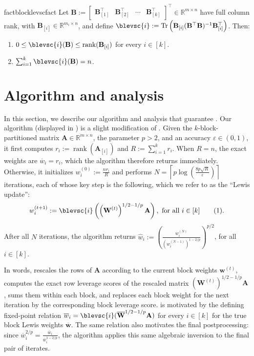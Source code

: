 \documentclass[11pt]{article}
\newcommand\numberthis{\addtocounter{equation}{1}\tag{\theequation}}
\theoremstyle{plain}
\numberwithin{equation}{section}
\newcommand{\R}{\mathbb{R}}
\newcommand{\Tr}{\operatorname{Tr}}
\newcommand{\rank}{\operatorname{rank}}
\newcommand{\eps}{\varepsilon}
\newcommand{\bA}{\mathbf{A}}
\newcommand{\bB}{\mathbf{B}}
\newcommand{\bW}{\mathbf{W}}
\newcommand{\bw}{\mathbf{w}}
\newcommand{\bwbar}{\overline{\mathbf{w}}}
\newcommand{\bAblk}[1]{\mathbf{A}_{[#1]}}
\newcommand{\what}{\widehat{w}}
\newcommand{\wbar}{\overline{w}}
\newcommand{\bWbar}{\overline{\mathbf{W}}}
\begin{document}
\begin{restatable}{fact}{blocklevscfact}\label{fact:block-levsc}
Let $\bB:=\begin{bmatrix}\bB_{[1]}^\top&\bB_{[2]}^\top&\cdots&\bB_{[k]}^\top\end{bmatrix}^\top\in\R^{m\times n}$ have full column rank, with $\bB_{[i]}\in\R^{m_i\times n}$, and define $\blevsc{i}:=\Tr\left(\bB_{[i]}(\bB^\top\bB)^{-1}\bB_{[i]}^\top\right)$. Then:
\begin{enumerate}
\item $0\leq\blevsc{i}(\bB)\leq\rank(\bB_{[i]})$ for every $i\in[k]$.
\item $\sum_{i=1}^k\blevsc{i}(\bB)=n$.
\end{enumerate}
\end{restatable}

\section{Algorithm and analysis}
\label{sec:main-results}
In this section, we describe our algorithm and analysis that guarantee . Our algorithm (displayed in ) is a slight modification of \cite[Algorithm 6]{lee2016faster}. Given the $k$-block-partitioned matrix $\bA\in\R^{m\times n}$, the parameter $p>2$, and an accuracy $\eps\in(0,1)$, it first computes $r_i:=\rank(\bAblk{i})$ and $R:=\sum_{i=1}^k r_i$. When $R=n$, the  exact weights are $\wbar_i=r_i$, which the algorithm therefore returns immediately. Otherwise, it initializes $w_i^{(0)}:=\frac{nr_i}{R}$ and performs $N=\left\lceil p\log\left(\frac{8p\sqrt{R}}{\eps}\right)\right\rceil$ iterations, each of whose key step is the following, which we refer to as the ``Lewis update'':\[ w_i^{(t+1)}:=\blevsc{i}\left(\left(\bW^{(t)}\right)^{1/2-1/p}\bA\right), \text{ for all } i \in [k] \numberthis\label{eq:Lewis-update}.\]After all $N$ iterations, the algorithm returns $\what_i
:=
\left(
\frac{w_i^{(N)}}{(w_i^{(N-1)})^{1-2/p}}
\right)^{p/2}$,
for all $i\in[k].$ 

In words,  rescales the rows of $\bA$ according to the current block weights $\bw^{(t)}$, computes the exact row leverage scores of 
the rescaled matrix $\left(\bW^{(t)}\right)^{1/2-1/p}\bA$, sums them within each block, and replaces each block weight for the next iteration by the corresponding block leverage score. 
 is motivated by the defining fixed-point relation $\wbar_i=\blevsc{i}(\bWbar^{1/2-1/p}\bA)$ for every $i\in[k]$ for the true block Lewis weights $\bwbar$.
The same relation also motivates the final postprocessing:   since
$\wbar_i^{2/p}=\frac{\wbar_i}{\wbar_i^{1-2/p}}$,
the algorithm applies this same algebraic inversion to the final pair of iterates.
\end{document}
